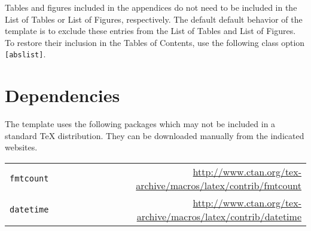 \documentclass{wmu-thesis}
\begin{document}
 Tables and figures included in the appendices do not need to be included in the List of Tables or List of Figures, respectively.  The default default behavior of the template is to exclude these entries from the List of Tables and List of Figures.  To restore their inclusion %
 in the Tables of Contents, 
 use the following class option \texttt{[abslist]}.

 
\section*{Dependencies}
The template uses the following packages which may not be included in a standard \TeX{} distribution.  They can be downloaded manually from the indicated websites.\\
\begin{center}
\begin{tabular}{lr}
\texttt{fmtcount}& \url{http://www.ctan.org/tex-archive/macros/latex/contrib/fmtcount}\\
\texttt{datetime}& \url{http://www.ctan.org/tex-archive/macros/latex/contrib/datetime}
\end{tabular}
\end{center}
\end{document}
